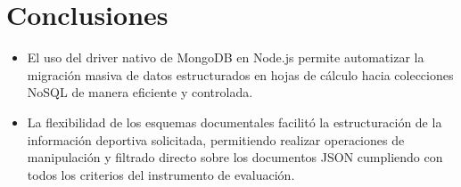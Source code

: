 \chapter{Conclusiones}
\begin{itemize}
    \item El uso del driver nativo de MongoDB en Node.js permite automatizar la migración masiva de datos estructurados en hojas de cálculo hacia colecciones NoSQL de manera eficiente y controlada.
    \item La flexibilidad de los esquemas documentales facilitó la estructuración de la información deportiva solicitada, permitiendo realizar operaciones de manipulación y filtrado directo sobre los documentos JSON cumpliendo con todos los criterios del instrumento de evaluación.
\end{itemize}



